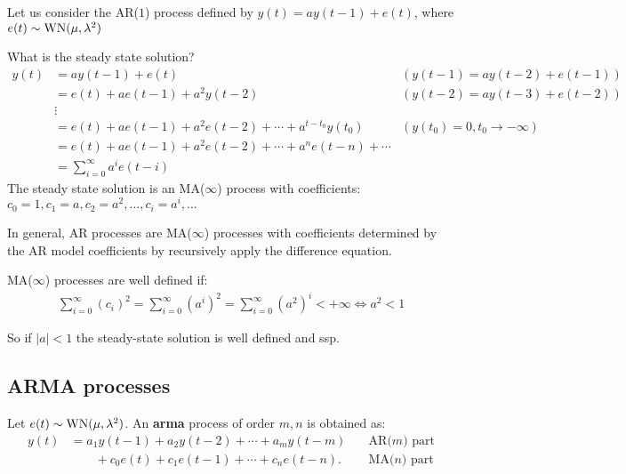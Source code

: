 \begin{example}
Let us consider the AR($1$) process defined by $y(t)=a y(t-1)+e(t)$, where $e(t) \sim \operatorname{WN}(\mu, \lambda^{2})$

What is the steady state solution?
\begin{align*}
	y(t) & =a y(t-1)+e(t) & (y(t-1)=a y(t-2)+e(t-1)) \\
	& =e(t)+a e(t-1)+a^{2} y(t-2) & (y(t-2)=a y(t-3)+e(t-2)) \\
	& \vdots & \\
	& =e(t)+a e(t-1)+a^{2} e(t-2)+\cdots+a^{t-t_{0}} y\left(t_{0}\right) & (y\left(t_{0}\right)=0,t_{0} \to-\infty) \\
	& =e(t)+a e(t-1)+a^{2} e(t-2)+\cdots+a^{n} e(t-n)+\cdots\\
	&=\sum_{i=0}^{\infty} a^{i} e(t-i)
\end{align*}
The steady state solution is an MA($\infty$) process with coefficients: $c_{0}=1, c_{1}=a, c_{2}=a^{2}, \ldots, c_{i}=a^{i}, \ldots$

In general, AR processes are MA($\infty$) processes with coefficients determined by the AR model coefficients by recursively apply the difference equation.

MA($\infty$) processes are well defined if:
\begin{align*}
	\sum_{i=0}^{\infty} \left(c_{i}\right)^2=\sum_{i=0}^{\infty} \left(a^{i}\right)^2=\sum_{i=0}^{\infty} \left(a^{2}\right)^i< +\infty \iff a^2< 1
\end{align*}

So if $|a|<1$ the steady-state solution is well defined and \gls{ssp}.
\end{example}

\subsection{ARMA processes}

\begin{definition}
	Let $e(t) \sim \operatorname{WN}(\mu, \lambda^{2})$. An \textbf{\gls{arma}} process of order $m,n$ is obtained as:
	\[
		\boxed{
			\begin{aligned}
				y(t)&=a_{1} y(t-1)+a_{2} y(t-2)+\cdots+a_{m} y(t-m)\quad & \text{AR($m$) part}\\
				&\qquad+c_{0} e(t)+c_{1} e(t-1)+\cdots+c_{n} e(t-n) . \quad & \text{MA($n$) part}
			\end{aligned}
		}
	\]
\end{definition}

